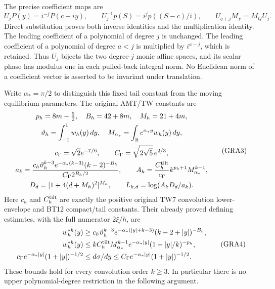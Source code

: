 \documentclass[11pt,a4paper]{article}
\begin{document}
The precise coefficient maps are
\begin{equation}
 U_jP(y)=i^{-j}P(c+iy),\qquad
 U_j^{-1}p(S)=i^jp((S-c)/i),\qquad
 U_{q+j}M_\chi=M_QU_j.
 \tag{GRA2}\label{gra:coordinates}
\end{equation}
Direct substitution proves both inverse identities and the multiplication
identity.  The leading coefficient of a polynomial of degree $j$ is
unchanged.  The leading coefficient of a polynomial of degree $a<j$ is
multiplied by $i^{a-j}$, which is retained.  Thus $U_j$ bijects the two
degree-$j$ monic affine spaces, and its scalar phase has modulus one in
each pulled-back integral norm.  No Euclidean norm of a coefficient vector
is asserted to be invariant under translation.

Write $\alpha_* =\pi/2$ to distinguish this fixed tail constant from
the moving equilibrium parameters.  The original AMT/TW constants are
\begin{equation}
 \begin{gathered}
 p_h=8m-\tfrac92,\quad B_h=42+8m,\quad M_h=21+4m,\\
 \vartheta_h=\int_{-1}^1w_h(y)\,dy,\quad
 M_{\alpha_*}=\int_{\mathbb R}e^{\alpha_*y}w_h(y)\,dy,\\
 c_\Gamma=\sqrt2e^{-7/6},\qquad
 C_\Gamma=\sqrt{2\sqrt5}\,e^{2/3},\\
 a_k=\frac{c_h\vartheta_h^{k-3}e^{-\alpha_*(k-3)}(k-2)^{-B_h}}
 {C_\Gamma2^{B_h/2}},\qquad
 A_k=\frac{C_h^{\rm tilt}}{c_\Gamma}k^{p_h+1}M_{\alpha_*}^{k-1},\\
 D_d=[1+4(d+M_h)^2]^{M_h},\qquad
 L_{k,d}=\log(A_kD_d/a_k).
 \end{gathered}\tag{GRA3}\label{gra:constants}
\end{equation}
Here $c_h$ and $C_h^{\rm tilt}$ are exactly the positive original TW7
convolution lower-envelope and BT12 compact/tail constants.  Their
already proved defining estimates, with the full numerator $2\xi/h$, are
\begin{equation}
 \begin{aligned}
 w_h^{*k}(y)&\ge c_h\vartheta_h^{k-3}
 e^{-\alpha_*(|y|+k-3)}(k-2+|y|)^{-B_h},\\
 w_h^{*k}(y)&\le kC_h^{\rm tilt}M_{\alpha_*}^{k-1}
 e^{-\alpha_*|y|}(1+|y|/k)^{-p_h},\\
 c_\Gamma e^{-\alpha_*|y|}(1+|y|)^{-1/2}
 &\le d\sigma/dy\le
 C_\Gamma e^{-\alpha_*|y|}(1+|y|)^{-1/2}.
 \end{aligned}\tag{GRA4}\label{gra:densitybounds}
\end{equation}
These bounds hold for every convolution order $k\ge3$.  In particular
there is no upper polynomial-degree restriction in the following argument.
\end{document}

